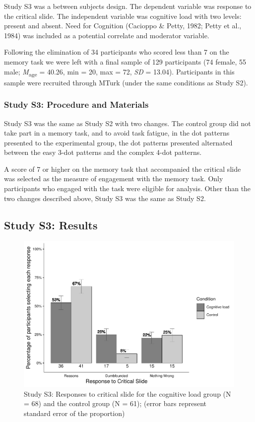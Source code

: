 \documentclass[
  man,floatsintext]{apa6}
\begin{document}
Study S3 was a between subjects design. The dependent variable was response to the critical slide. The independent variable was cognitive load with two levels: present and absent. Need for Cognition (Cacioppo \& Petty, 1982; Petty et al., 1984) was included as a potential correlate and moderator variable.

Following the elimination of 34 participants who scored less than 7 on the memory task we were left with a final sample of 129 participants (74 female, 55 male; \emph{M}\textsubscript{age} = 40.26, min = 20, max = 72, \emph{SD} = 13.04). Participants in this sample were recruited through MTurk (under the same conditions as Study S2).

\hypertarget{study-s3-procedure-and-materials}{%
\subsubsection{Study S3: Procedure and Materials}\label{study-s3-procedure-and-materials}}

Study S3 was the same as Study S2 with two changes. The control group did not take part in a memory task, and to avoid task fatigue, in the dot patterns presented to the experimental group, the dot patterns presented alternated between the easy 3-dot patterns and the complex 4-dot patterns.

A score of 7 or higher on the memory task that accompanied the critical slide was selected as the measure of engagement with the memory task. Only participants who engaged with the task were eligible for analysis. Other than the two changes described above, Study S3 was the same as Study S2.

\hypertarget{study-s3-results}{%
\subsection{Study S3: Results}\label{study-s3-results}}

\begin{figure}[!h]
\includegraphics{Supplementary_files/figure-latex/S3ch5S3fig2criticalcondition-1} \caption{Study S3: Responses to critical slide for the cognitive load group (N = 68) and the control group (N = 61); (error bars represent standard error of the proportion)}\label{fig:S3ch5S3fig2criticalcondition}
\end{figure}
\end{document}
